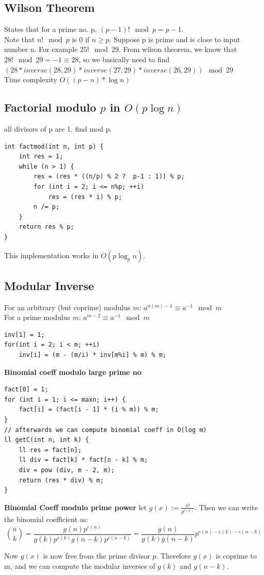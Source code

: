 \documentclass[8pt, a4paper, oneside, twocolumn]{extarticle}
\begin{document}
\subsection{Wilson Theorem}
States that for a prime no. p, $(p - 1)! \mod p = p - 1$.
\\Note that $n! \mod p$ is 0 if $n \geq p$. Suppose p is prime and is close to input number n. For example $25! \mod 29$. From wilson theorem, we know that $28! \mod 29 = -1 \equiv 28$, so we basically need to find $(28 * inverse(28, 29) * inverse (27, 29) * inverse (26, 29)) \mod 29$
\\Time complexity $O((p - n) * \log n)$
\subsection{Factorial modulo $p$ in $O(p \log n)$}
all divisors of p are 1, find mod p.
\begin{verbatim}
int factmod(int n, int p) {
	int res = 1;
	while (n > 1) {
		res = (res * ((n/p) % 2 ?  p-1 : 1)) % p;
		for (int i = 2; i <= n%p; ++i)
			res = (res * i) % p;
		n /= p;
	}
	return res % p;
}
\end{verbatim}
This implementation works in $O(p \log_p n)$.
\subsection{Modular Inverse}
For an arbitrary (but coprime) modulus $m$: $a ^ {\phi (m) - 1} \equiv a ^{-1} \mod m$\\
For a prime modulus $m$: $a ^ {m - 2} \equiv a ^ {-1} \mod m$
\begin{verbatim}
inv[1] = 1;
for(int i = 2; i < m; ++i)
    inv[i] = (m - (m/i) * inv[m%i] % m) % m;
\end{verbatim}
\textbf{Binomial coeff modulo large prime no}
\begin{verbatim}
fact[0] = 1;
for (int i = 1; i <= maxn; i++) {
    fact[i] = (fact[i - 1] * (i % m)) % m;
}
// afterwards we can compute binomial coeff in O(log m)
ll getC(int n, int k) {
    ll res = fact[n];
    ll div = fact[k] * fact[n - k] % m;
    div = pow (div, m - 2, m);
    return (res * div) % m;
}
\end{verbatim}
\textbf{Binomial Coeff modulo prime power}
let $g(x) := \frac{x!}{p^{c(x)}}$. Then we can write the binomial coefficient as: $$\binom n k = \frac {g(n) p^{c(n)}} {g(k) p^{c(k)} g(n-k) p^{c(n-k)}} = \frac {g(n)} {g(k) g(n-k)}p^{c(n) - c(k) - c(n-k)}$$

Now $g(x)$ is now free from the prime divisor $p$. Therefore $g(x)$ is coprime to m, and we can compute the modular inverses of $g(k)$ and $g(n-k)$.
\end{document}
